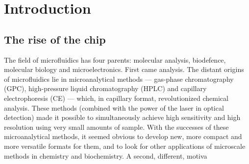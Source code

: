 

\chapter{Introduction}

\ifpdf
    \graphicspath{{1_introduction/figures/PNG/}{1_introduction/figures/PDF/}{1_introduction/figures/}}
\else
    \graphicspath{{1_introduction/figures/EPS/}{1_introduction/figures/}}
\fi







\section{The rise of the chip} %

The field of microfluidics has four parents: molecular analysis, biodefence, molecular biology and microelectronics. 
First came analysis. The distant origins of microfluidics lie in microanalytical methods — gas-phase chromatography (GPC), 
high-pressure liquid chromatography (HPLC) and capillary electrophoresis (CE) — which, in capillary format, revolutionized chemical analysis. These methods (combined with the power of the laser in optical detection) made it possible to simultaneously achieve high sensitivity and high resolution using very small amounts of sample. With the successes of these microanalytical methods, it seemed obvious to develop new, more compact and more versatile formats for them, and to look for other applications of microscale methods in chemistry and biochemistry. A second, different, motiva

